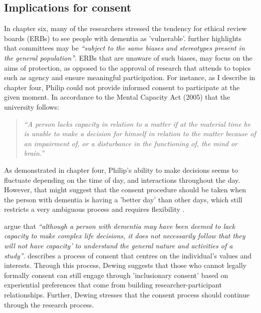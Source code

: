 \subsection{Implications for consent}
\label{Cosent-Implications}
In chapter six, many of the researchers stressed the tendency for ethical review boards (ERBs) to see people with dementia as 'vulnerable'. \cite{pachana_can_2014} further highlights that committees may be \textit{``subject to the same biases and stereotypes present in the general population''}. ERBs that are unaware of such biases, may focus on the aims of protection, as opposed to the approval of research that attends to topics such as agency and ensure meaningful participation. For instance, as I describe in chapter four, Philip could not provide informed consent to participate at the given moment. In accordance to the Mental Capacity Act (2005) that the university follows:

\begin{quote}
\textit{``A person lacks capacity in relation to a matter if at the material time he is unable to make a decision for himself in relation to the matter because of an impairment of, or a disturbance in the functioning of, the mind or brain.''} \citep{oyebode_mental_2005}
\end{quote}

As demonstrated in chapter four, Philip's ability to make decisions seems to fluctuate depending on the time of day, and interactions throughout the day. However, that might suggest that the consent procedure should be taken when the person with dementia is having a 'better day' than other days, which still restricts a very ambiguous process and requires flexibility \citep{trachsel2015cognitive}. 

\cite{o2021advocating} argue that \textit{``although a person with dementia may have been deemed to lack capacity to make complex life decisions, it does not necessarily follow that they will not have capacity' to understand the general nature and activities of a study''}. \cite{dewing_participatory_2007} describes a process of consent that centres on the individual's values and interests. Through this process, Dewing suggests that those who cannot legally formally consent can still engage through 'inclusionary consent' based on experiential preferences that come from building researcher-participant relationships. Further, Dewing stresses that the consent process should continue through the research process.

